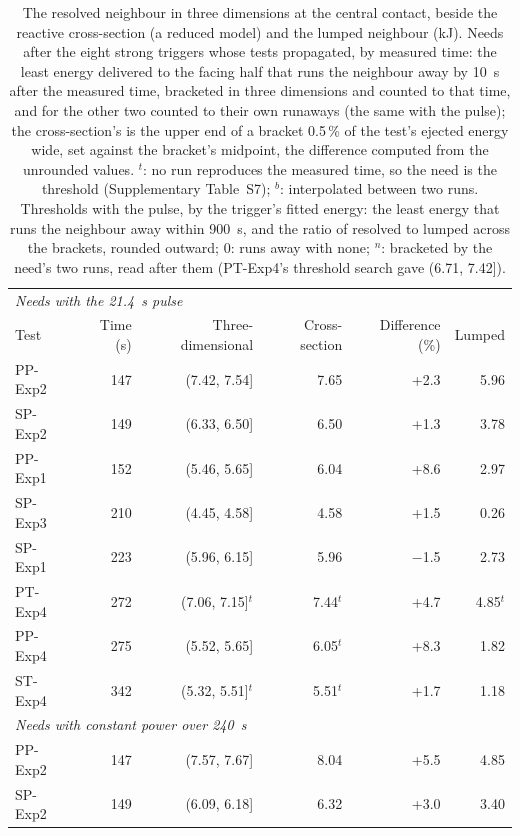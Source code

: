 \begin{table}[!tbp]
\centering
\scriptsize
\caption{The resolved neighbour in three dimensions at the central contact, beside the reactive cross-section (a reduced model) and the lumped neighbour (kJ). Needs after the eight strong triggers whose tests propagated, by measured time: the least energy delivered to the facing half that runs the neighbour away by 10~s after the measured time, bracketed in three dimensions and counted to that time, and for the other two counted to their own runaways (the same with the pulse); the cross-section's is the upper end of a bracket 0.5\,\% of the test's ejected energy wide, set against the bracket's midpoint, the difference computed from the unrounded values. $^{t}$: no run reproduces the measured time, so the need is the threshold (Supplementary Table~S7); $^{b}$: interpolated between two runs. Thresholds with the pulse, by the trigger's fitted energy: the least energy that runs the neighbour away within 900~s, and the ratio of resolved to lumped across the brackets, rounded outward; 0: runs away with none; $^{n}$: bracketed by the need's two runs, read after them (PT-Exp4's threshold search gave (6.71, 7.42]).}
\label{tab:3d}
\setlength{\tabcolsep}{4pt}
\begin{tabular}{lrrrrr}
\toprule
\multicolumn{6}{l}{\textit{Needs with the 21.4~s pulse}} \\
Test & Time (s) & Three-dimensional & Cross-section & Difference (\%) & Lumped \\
\midrule
PP-Exp2 & 147 & (7.42, 7.54] & 7.65 & +2.3 & 5.96 \\
SP-Exp2 & 149 & (6.33, 6.50] & 6.50 & +1.3 & 3.78 \\
PP-Exp1 & 152 & (5.46, 5.65] & 6.04 & +8.6 & 2.97 \\
SP-Exp3 & 210 & (4.45, 4.58] & 4.58 & +1.5 & 0.26 \\
SP-Exp1 & 223 & (5.96, 6.15] & 5.96 & $-$1.5 & 2.73 \\
PT-Exp4 & 272 & (7.06, 7.15]$^{t}$ & 7.44$^{t}$ & +4.7 & 4.85$^{t}$ \\
PP-Exp4 & 275 & (5.52, 5.65] & 6.05$^{t}$ & +8.3 & 1.82 \\
ST-Exp4 & 342 & (5.32, 5.51]$^{t}$ & 5.51$^{t}$ & +1.7 & 1.18 \\
\midrule
\multicolumn{6}{l}{\textit{Needs with constant power over 240~s}} \\
PP-Exp2 & 147 & (7.57, 7.67] & 8.04 & +5.5 & 4.85 \\
SP-Exp2 & 149 & (6.09, 6.18] & 6.32 & +3.0 & 3.40 \\

\end{tabular}
\end{table}
